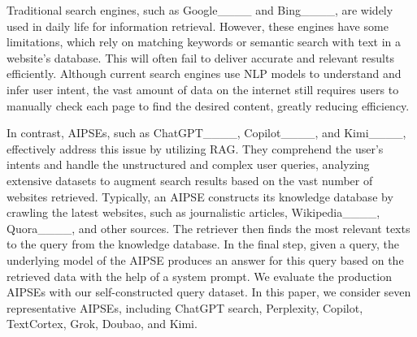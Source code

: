 Traditional search engines, such as Google____ and Bing____, are widely used in daily life for information retrieval.
However, these engines have some limitations, which rely on matching keywords or semantic search with text in a website’s database.
This will often fail to deliver accurate and relevant results efficiently.
Although current search engines use NLP models to understand and infer user intent, the vast amount of data on the internet still requires users to manually check each page to find the desired content, greatly reducing efficiency.

In contrast, AIPSEs, such as ChatGPT____, Copilot____, and Kimi____, effectively address this issue by utilizing RAG.
They comprehend the user's intents and handle the unstructured and complex user queries, analyzing extensive datasets to augment search results based on the vast number of websites retrieved.
Typically, an AIPSE constructs its knowledge database by crawling the latest websites, such as journalistic articles, Wikipedia____, Quora____, and other sources.
The retriever then finds the most relevant texts to the query from the knowledge database.
In the final step, given a query, the underlying model of the AIPSE produces an answer for this query based on the retrieved data with the help of a system prompt.
We evaluate the production AIPSEs with our self-constructed query dataset.
In this paper, we consider seven representative AIPSEs, including ChatGPT search, Perplexity, Copilot, TextCortex, Grok, Doubao, and Kimi.


